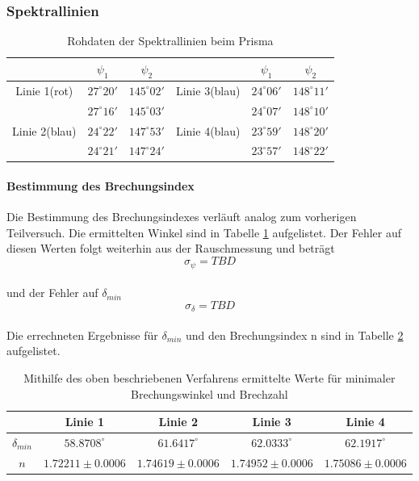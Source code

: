 \documentclass[12pt,a4paper]{article}
\begin{document}
\subsubsection{Spektrallinien}
\begin{table}
\begin{tabular}{|c|c|c||c|c|c|}
\hline 
 & $\psi_1$ & $\psi_2$ & & $\psi_1$ & $\psi_2$ \\ 
\hline 
Linie 1(rot) & $27^\circ 20'$ & $145^\circ 02'$ & Linie 3(blau) & $24^\circ 06'$ & $148^\circ 11'$\\ 
\hline 
 & $27^\circ 16'$ & $145^\circ 03'$& & $24^\circ 07'$ & $148^\circ 10'$\\
\hline
\hline 
\hline 
Linie 2(blau) & $24^\circ 22'$ & $147^\circ 53'$ & Linie 4(blau) & $23^\circ 59'$ & $148^\circ 20'$\\ 
\hline 
 & $24^\circ 21'$ & $147^\circ 24'$&  & $23^\circ 57'$ & $148^\circ 22'$\\ 
\hline 
\end{tabular} 
\caption{Rohdaten der Spektrallinien beim Prisma}
\label{tab:Spektrallinien_rohdaten}
\end{table}

\paragraph{Bestimmung des Brechungsindex}
Die Bestimmung des Brechungsindexes verläuft analog zum vorherigen Teilversuch. Die ermittelten Winkel sind in Tabelle \ref{tab:Spektrallinien_rohdaten} aufgelistet.
Der Fehler auf diesen Werten folgt weiterhin aus der Rauschmessung und beträgt
\begin{equation}
\sigma_{\psi} = TBD
\end{equation}\\
und der Fehler auf $\delta_{min}$
\begin{equation}
\sigma_{\delta} = TBD
\end{equation}\\
Die errechneten Ergebnisse für $\delta_{min}$ und den Brechungsindex n sind in Tabelle \ref{tab:Spekrallinien_Brechungsndex} aufgelistet.

\begin{table}
\begin{tabular}{|c|c|c|c|c|}
\hline
 & Linie 1 & Linie 2 & Linie 3 & Linie 4\\
\hline
$\delta_{min}$ & $58.8708^\circ$ & $61.6417^\circ$ & $62.0333^\circ$ & $62.1917^\circ$\\
\hline
$n$ & $1.72211\pm 0.0006$ & $1.74619\pm 0.0006$ & $1.74952\pm 0.0006$ & $1.75086\pm 0.0006$\\
\hline
\end{tabular}
\caption{Mithilfe des oben beschriebenen Verfahrens ermittelte Werte für minimaler Brechungswinkel und Brechzahl}
\label{tab:Spekrallinien_Brechungsndex}
\end{table}
\end{document}
